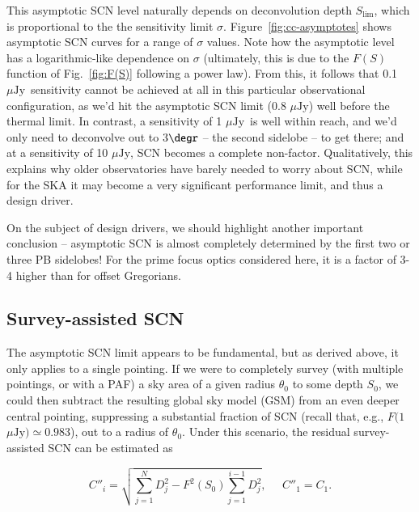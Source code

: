 \documentclass{aa}
\newcommand{\uJy}{$\mu\mathrm{Jy}$}
\begin{document}
This asymptotic SCN level naturally depends on deconvolution depth $S_{\lim}$, which is proportional to the the sensitivity limit $\sigma$. Figure~\ref{fig:cc-asymptotes} shows asymptotic SCN curves for a range of $\sigma$ values. Note how the asymptotic level has a logarithmic-like dependence on $\sigma$ (ultimately, this is due to the $F(S)$ function of Fig.~\ref{fig:F(S)} following a power law). From this, it follows that 0.1 \uJy\ sensitivity cannot be achieved at all in this particular observational configuration, as we'd hit the asymptotic SCN limit (0.8 \uJy) well before the thermal limit. In contrast, a sensitivity of 1 \uJy\ is well within reach, and we'd only need to deconvolve out to 3$\degr$ -- the second sidelobe -- to get there; and at a sensitivity of 10 \uJy, SCN becomes a complete non-factor. Qualitatively, this explains why older observatories have barely needed to worry about SCN, while for the SKA it may become a very significant performance limit, and thus a design driver.

On the subject of design drivers, we should highlight another important conclusion -- asymptotic SCN is almost completely determined by the first two or three PB sidelobes! For the prime focus optics considered here, it is a factor of 3-4 higher than for offset Gregorians.

\subsection{Survey-assisted SCN}

The asymptotic SCN limit appears to be fundamental, but as derived above, it only applies to a single pointing. If we were to completely survey (with multiple pointings, or with a PAF) a sky area of a given radius $\theta_0$ to some depth $S_0$, we could then subtract the resulting global sky model (GSM) from an even deeper central pointing, suppressing a substantial fraction of SCN (recall that, e.g., $F(1$\uJy$)\simeq0.983$), out to a radius of $\theta_0$. Under this scenario, the residual survey-assisted SCN can be estimated as

\[
  C''_i = \sqrt{ \sum_{j=1}^{N} D^2_j - F^2(S_0) \sum_{j=1}^{i-1} D_j^2 }, \;\;\;\;\; C''_1=C_1.
\]
\end{document}
